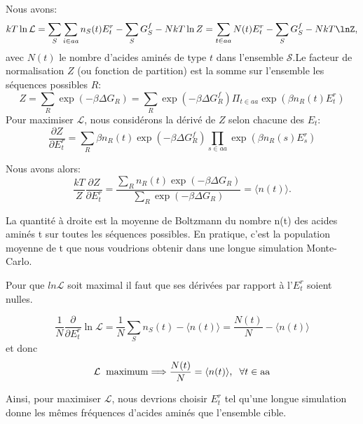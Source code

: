 Nous avons:
\begin{equation}
  kT \ln \mathcal{L} = \sum_S\sum_{i \in aa} n_S(t)E^r_t - \sum_S G^f_S - N kT \ln Z
                     = \sum_{t \in aa} N(t) E^r_t - \sum_SG^f_S - N kT \lnZ,
\end{equation}
avec $N(t)$ le nombre d'acides aminés de type $t$ dans l'ensemble $\mathcal{S}$.Le facteur de normalisation $Z$ (ou fonction de partition) est la somme sur l'ensemble les séquences possibles $R$:
\begin{equation}
  Z=\sum_R \exp(-\beta \Delta G_R) = \sum_R \exp(-\beta\Delta G^f_R)\Pi_{t\in aa}\exp(\beta n_R (t) E^r_t)
\end{equation} 
Pour maximiser $\mathcal{L}$, nous considérons la dérivé de $Z$ selon chacune des $E_t$:
\begin{equation}
\frac{ \partial Z }{ \partial E^r_t } = 
   \sum_R \beta n_R(t) \exp (-\beta \Delta G^f_R) \prod_{s \in aa} \exp(\beta n_R(s) E^r_s) 
\end{equation}

Nous avons alors:
\begin{equation}
\frac{kT}{Z} \frac{ \partial Z }{ \partial E^r_t }
   = \frac{ \sum_R n_R(t) \exp(-\beta \Delta G_R) }{ \sum_R \exp(-\beta \Delta G_R) } = \langle n(t) \rangle.
\end{equation}

La quantité à droite est la moyenne de Boltzmann du nombre n(t) des acides aminés t sur toutes les séquences possibles. En pratique, c'est la population moyenne de t que nous voudrions obtenir dans une longue simulation Monte-Carlo. 

Pour que $ln \mathcal{L}$ soit maximal il faut que ses dérivées par rapport à l'$E_t^r$ soient nulles.

\begin{equation}
\frac{1}{N} \frac{\partial}{\partial E^r_t} \ln {\mathcal L} = \frac{1}{N} \sum_S n_S(t) - \langle n(t) \rangle 
   = \frac{N(t)}{N} - \langle n(t) \rangle
\end{equation}
et donc
\begin{displaymath}
{\mathcal L} \hspace*{2mm} {\rm maximum} \Longrightarrow \frac{N(t)}{N} = \langle n(t) \rangle, 
\hspace*{2mm} \forall t \in {\rm aa}
\label{eq:optimum}
\end{displaymath}

Ainsi, pour maximiser $\mathcal{L}$, nous devrions choisir ${E^r_t}$ tel qu'une longue simulation donne les mêmes fréquences d'acides aminés que l'ensemble cible.


